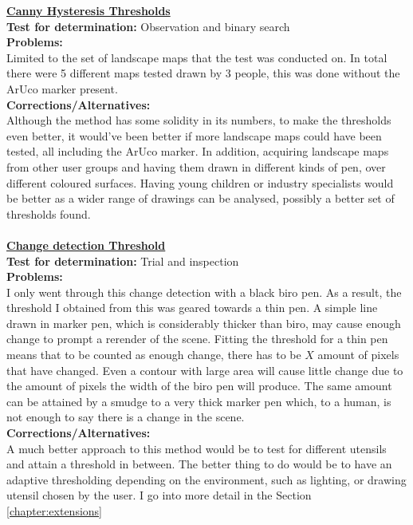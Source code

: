 \documentclass[11pt]{article}
\begin{document}
\underline{\textbf{Canny Hysteresis Thresholds}}\\
\textbf{Test for determination:} Observation and binary search\\
\textbf{Problems:}\\ Limited to the set of landscape maps
				that the test was conducted on. In total
				there were 5 different maps tested drawn by 3 
				people, this was done without the ArUco marker
				present.\\
\textbf{Corrections/Alternatives:}\\
		Although the method has some solidity in its
		numbers, to make the thresholds even better, it
		would've been better if more landscape maps could
		have been tested, all including the ArUco marker. In
		addition, acquiring landscape maps from other user
		groups and having them drawn in different kinds of
		pen, over different coloured surfaces. Having 
		young children or industry specialists
		would be better as a wider range of drawings can be 
		analysed, possibly a better set of thresholds found. \\
\\
\underline{\textbf{Change detection Threshold}}\\
\textbf{Test for determination:} Trial and inspection\\
\textbf{Problems:}\\ I only went through this change detection with
				a black biro pen. As a result, the threshold I obtained
				from this was geared towards a thin pen. A 
				simple line drawn in marker pen, which is considerably thicker
				than biro, may cause enough change to prompt a rerender of
				the scene. Fitting the threshold for a thin pen means that
				to be counted as enough change, there has to be $X$ amount
				of pixels that have changed. Even a contour with large
				area will cause little change due to the amount of pixels
				the width of the biro pen will produce. The same amount
				can be attained by a smudge to a very thick marker pen which,
				to a human, is not enough to say there is a change in the
				scene.\\
\textbf{Corrections/Alternatives:}\\ A much better approach to this method
				would be to test for different utensils and attain a
				threshold in between. The better thing to do would be
				to have an adaptive thresholding depending on the environment,
				such as lighting, or drawing utensil chosen by the user.
				I go into more detail in the Section \ref{chapter:extensions}
\end{document}
